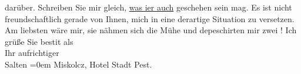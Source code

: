 \begin{ledgroupsized}[t]{13cm}
               darüber. Schreiben Sie mir gleich, \uline{was i{\geminationm}er auch} geschehen sein mag.\pend
           \pstart
           Es ist nicht freundschaftlich gerade von {\pb}Ihnen, mich in eine
               derartige Situation zu versetzen. Am liebsten wäre mir, sie nähmen sich die Mühe und
               depeschirten mir zwei \label{K_L03104-2v}\label{K_L03104-2h}!\pend
           \pstart
           Ich grüße Sie besti{\geminationm}t als{\\[\baselineskip]}Ihr aufrichtiger{\\[\baselineskip]}\spacefill\mbox{Salten}\pend
           \leftskip=0em{}\pstart
           Miskolcz, Hotel Stadt Pest.\pend
           
         
         \endnumbering{}\end{ledgroupsized}  \newcommand{\dateiname}{L03104}\newcommand{\titel}{Felix Salten an Arthur Schnitzler, [10. 9. 1891]}\newcommand{\editorInnen}{Martin Anton Müller und Laura Untner}
      